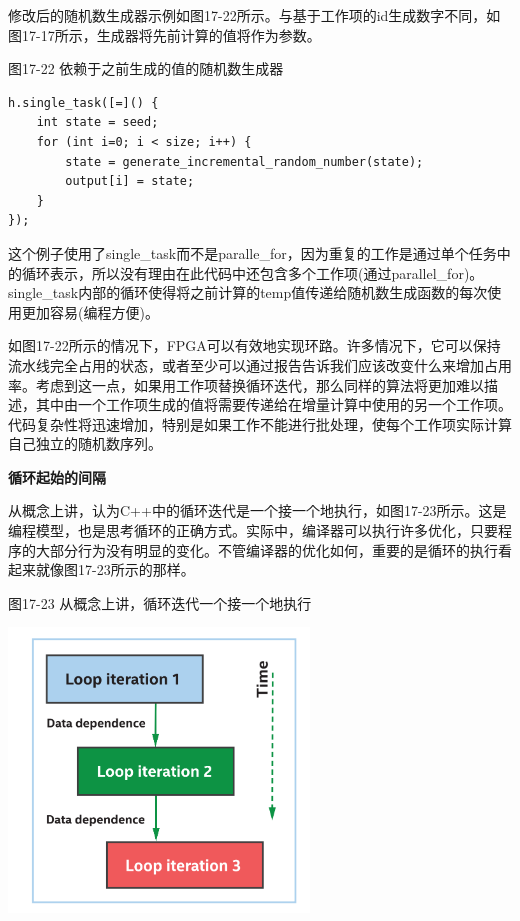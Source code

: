 修改后的随机数生成器示例如图17-22所示。与基于工作项的id生成数字不同，如图17-17所示，生成器将先前计算的值将作为参数。\par

\hspace*{\fill} \par %
图17-22 依赖于之前生成的值的随机数生成器
\begin{lstlisting}[caption={}]
h.single_task([=]() {
	int state = seed;
	for (int i=0; i < size; i++) {
		state = generate_incremental_random_number(state);
		output[i] = state;
	}
});
\end{lstlisting}

这个例子使用了single\_task而不是paralle\_for，因为重复的工作是通过单个任务中的循环表示，所以没有理由在此代码中还包含多个工作项(通过parallel\_for)。single\_task内部的循环使得将之前计算的temp值传递给随机数生成函数的每次使用更加容易(编程方便)。\par

如图17-22所示的情况下，FPGA可以有效地实现环路。许多情况下，它可以保持流水线完全占用的状态，或者至少可以通过报告告诉我们应该改变什么来增加占用率。考虑到这一点，如果用工作项替换循环迭代，那么同样的算法将更加难以描述，其中由一个工作项生成的值将需要传递给在增量计算中使用的另一个工作项。代码复杂性将迅速增加，特别是如果工作不能进行批处理，使每个工作项实际计算自己独立的随机数序列。\par

\hspace*{\fill} \par %
\textbf{循环起始的间隔}

从概念上讲，认为C++中的循环迭代是一个接一个地执行，如图17-23所示。这是编程模型，也是思考循环的正确方式。实际中，编译器可以执行许多优化，只要程序的大部分行为没有明显的变化。不管编译器的优化如何，重要的是循环的执行看起来就像图17-23所示的那样。\par

\hspace*{\fill} \par %
图17-23 从概念上讲，循环迭代一个接一个地执行
\begin{center}
	\includegraphics[width=0.6\textwidth]{content/chapter-17/images/18}
\end{center}

